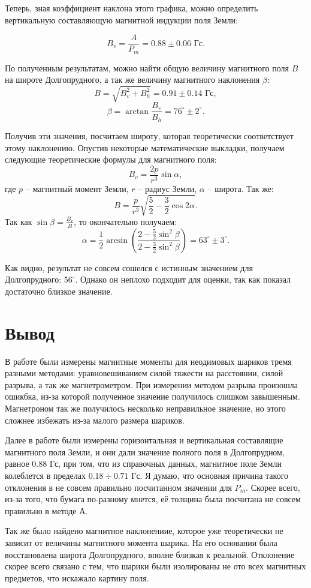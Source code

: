 \documentclass[a4paper, 14pt]{extarticle}%
\begin{document}
Теперь, зная коэффициент наклона этого графика, можно определить вертикальную составляющую магнитной индукции поля Земли:

\[B_v = \frac{A}{P_m} = 0.88\pm0.06 \text{ Гс}.\]

По полученным результатам, можно найти общую величину магнитного поля $B$ на широте Долгопрудного, а так же величину магнитного наклонения $\beta$:
\[B = \sqrt{B_v^2+B_h^2} = 0.91\pm 0.14\text{ Гс},\]
\[\beta = \arctan\frac{B_v}{B_h} = 76^{\circ}\pm2^{\circ}.\]

Получив эти значения, посчитаем широту, которая теоретически соответствует этому наклонению. Опустив некоторые математические выкладки, получаем следующие теоретические формулы для магнитного поля:
\[B_v = \frac{2p}{r^3}\sin\alpha,\]
где $p$ -- магнитный момент Земли, $r$ -- радиус Земли, $\alpha$  -- широта. Так же:
\[B = \frac{p}{r^3}\sqrt{\frac{5}{2} - \frac{3}{2}\cos2\alpha}.\]
Так как
$\sin\beta = \frac{B_v}{B}$, то окончательно получаем:
\[\alpha = \frac{1}{2}\arcsin\left( \dfrac{2 - \frac{5}{2}\sin^2\beta}{2 - \frac{3}{2}\sin^2\beta}\right)  = 63^{\circ}\pm3^{\circ}.\]

Как видно, результат не совсем сошелся с истинным значением для Долгопрудного: $56^{\circ}$. Однако он неплохо подходит для оценки, так как показал достаточно близкое значение. 
\section*{Вывод}
В работе были измерены магнитные моменты для неодимовых шариков тремя разными методами: уравновешиванием силой тяжести на расстоянии, силой разрыва, а так же магнетрометром. При измерении методом разрыва произошла ошикбка, из-за которой полученное значение получилось слишком завышенным. Магнетроном так же получилось несколько неправильное значение, но этого сложнее избежать из-за малого размера шариков. 

Далее в работе были измерены горизонтальная и вертикальная составлящие магнитного поля Земли, и они дали значение полного поля в Долгопрудном, равное 0.88 Гс, при том, что из справочных данных, магнитное поле Земли колеблется в пределах $0.18\div0.71$ Гс. Я думаю, что основная причина такого отклонения в не совсем правильно посчитанном значении для $P_m$. Скорее всего, из-за того, что бумага по-разному мнется, её толщина была посчитана не совсем правильно в методе А.

Так же было найдено магнитное наклонениие, которое уже теоретически не зависит от величины магнитного момента шарика. На его основании была восстановлена широта Долгопрудного, вполне близкая к реальной. Отклонение скорее всего связано с тем, что шарики были изолированы не ото всех магнитных предметов, что искажало картину поля.
\end{document}
